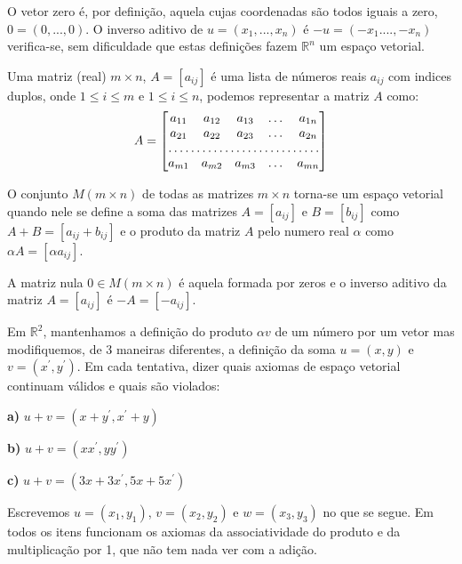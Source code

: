 O vetor zero é, por definição, aquela cujas coordenadas são todos iguais a zero, $0=\left(0,...,0\right)$. O inverso aditivo de $u=\left(x_{1},...,x_{n}\right)$ é $-u=\left(-x_{1}....,-x_{n} \right)$ verifica-se, sem dificuldade que estas definições fazem $\mathbb{R}^{n}$ um espaço vetorial.

\begin{ex}
Uma matriz (real) $m\times n$, $A=[a_{ij}]$ é uma lista de números reais $a_{ij}$ com indices duplos, onde $1\leqslant i \leqslant m$ e $1\leqslant i \leqslant n$, podemos representar a matriz $A$ como: \\
\begin{equation*}
A=\begin{bmatrix}
a_{11}       & a_{12} & a_{13} & \dots & a_{1n} \\
a_{21}       & a_{22} & a_{23} & \dots & a_{2n} \\
\hdotsfor{5} \\
a_{m1}       & a_{m2} & a_{m3} & \dots & a_{mn}
\end{bmatrix}
\end{equation*}
\end{ex}
O conjunto $M\left( m\times n\right) $ de todas as matrizes $m\times n$ torna-se um espaço vetorial quando nele se define a soma das matrizes $A=[a_{ij}]$ e $B=[b_{ij}]$ como $A+B=[a_{ij}+b_{ij}]$ e o produto da matriz $A$ pelo numero real $\alpha$ como $\alpha A=[\alpha a_{ij}]$. 

A matriz nula $0\in M\left(m\times n\right)$ é aquela formada por zeros e o inverso aditivo da matriz $A=[a_{ij}]$ é $-A=[-a_{ij}]$.

\begin{ex}
Em $\mathbb{R}^{2}$, mantenhamos a definição do produto $\alpha v$ de um número por um vetor mas modifiquemos, de 3 maneiras diferentes, a definição da soma $u=\left(x, y\right) $ e $v=\left(x^{'}, y^{'}\right) $. Em cada tentativa,  dizer quais axiomas de espaço vetorial continuam válidos e quais são violados:

\textbf{a)} $u+v=\left(x+y^{'}, x^{'}+y \right) $

\textbf{b)} $u+v=\left(xx^{'},yy^{'} \right) $

\textbf{c)} $u+v=\left(3x+3x^{'},5x+5x^{'} \right)$
\end{ex}
Escrevemos $u=(x_{1},y_{1})$, $v=(x_{2},y_{2})$ e $w=(x_{3},y_{3})$ no que se segue. Em todos os itens funcionam os axiomas da associatividade do produto e da multiplicação por 1, que não tem nada ver com a adição.\\

